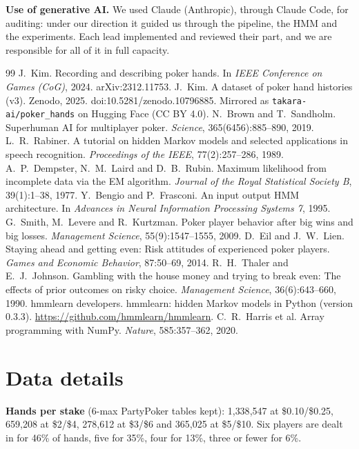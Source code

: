 \documentclass{article}
\begin{document}
\textbf{Use of generative AI.} We used Claude (Anthropic), through Claude Code, for auditing: under our direction it guided us through the pipeline, the HMM and the experiments. Each lead implemented and reviewed their part, and we are responsible for all of it in full capacity.

\begin{thebibliography}{99}
\small
{} J.~Kim. Recording and describing poker hands. In \emph{IEEE Conference on Games (CoG)}, 2024. arXiv:2312.11753.
 J.~Kim. A dataset of poker hand histories (v3). Zenodo, 2025. doi:10.5281/zenodo.10796885. Mirrored as \texttt{takara-ai/poker\_hands} on Hugging Face (CC BY 4.0).
 N.~Brown and T.~Sandholm. Superhuman AI for multiplayer poker. \emph{Science}, 365(6456):885--890, 2019.
 L.~R.~Rabiner. A tutorial on hidden Markov models and selected applications in speech recognition. \emph{Proceedings of the IEEE}, 77(2):257--286, 1989.
 A.~P.~Dempster, N.~M.~Laird and D.~B.~Rubin. Maximum likelihood from incomplete data via the EM algorithm. \emph{Journal of the Royal Statistical Society B}, 39(1):1--38, 1977.
 Y.~Bengio and P.~Frasconi. An input output HMM architecture. In \emph{Advances in Neural Information Processing Systems 7}, 1995.
 G.~Smith, M.~Levere and R.~Kurtzman. Poker player behavior after big wins and big losses. \emph{Management Science}, 55(9):1547--1555, 2009.
 D.~Eil and J.~W.~Lien. Staying ahead and getting even: Risk attitudes of experienced poker players. \emph{Games and Economic Behavior}, 87:50--69, 2014.
 R.~H.~Thaler and E.~J.~Johnson. Gambling with the house money and trying to break even: The effects of prior outcomes on risky choice. \emph{Management Science}, 36(6):643--660, 1990.
 hmmlearn developers. hmmlearn: hidden Markov models in Python (version 0.3.3). \url{https://github.com/hmmlearn/hmmlearn}.
 C.~R.~Harris et al. Array programming with NumPy. \emph{Nature}, 585:357--362, 2020.
\end{thebibliography}

\clearpage
\appendix
\section{Data details}
\label{app:data}
\textbf{Hands per stake} (6-max PartyPoker tables kept): 1{,}338{,}547 at \$0.10/\$0.25, 659{,}208 at \$2/\$4, 278{,}612 at \$3/\$6 and 365{,}025 at \$5/\$10. Six players are dealt in for 46\% of hands, five for 35\%, four for 13\%, three or fewer for 6\%.
\end{document}

